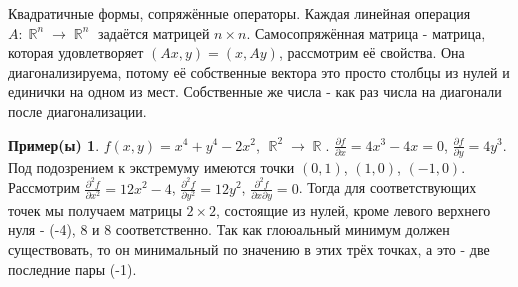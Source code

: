 \documentclass[a4paper,100pt]{article}
\theoremstyle{indented}
\theoremstyle{definition}
\newtheorem{exl}{Пример(ы)}
\theoremstyle{remark}
\DeclareMathOperator{\RR}{\mathbb{R}}
\begin{document}
Квадратичные формы, сопряжённые операторы. Каждая линейная операция $A:\RR^n\rightarrow \RR^n$ задаётся матрицей $n\times n$. Самосопряжённая матрица - матрица, которая удовлетворяет $(Ax, y)=(x, Ay)$, рассмотрим её свойства. Она диагонализируема, потому её собственные вектора это просто столбцы из нулей и единички на одном из мест. Собственные же числа - как раз числа на диагонали после диагонализации.

\begin{exl}
    $f(x, y)=x^4+y^4-2x^2$, $\RR^2\rightarrow \RR$. $\frac{\partial f}{\partial x}=4x^3-4x=0$, $\frac{\partial f}{\partial y}=4y^3$. Под подозрением к экстремуму имеются точки $(0, 1)$, $(1, 0)$, $(-1, 0)$. Рассмотрим $\frac{\partial^2 f}{\partial x^2}=12x^2-4$, $\frac{\partial^2 f}{\partial y^2}=12y^2$, $\frac{\partial^2 f}{\partial x \partial y}= 0$. Тогда для соответствующих точек мы получаем матрицы $2\times 2$, состоящие из нулей, кроме левого верхнего нуля - (-4), 8 и 8 соответственно. Так как глоюальный минимум должен существовать, то он минимальный по значению в этих трёх точках, а это - две последние пары (-1). 
\end{exl}
\end{document}
